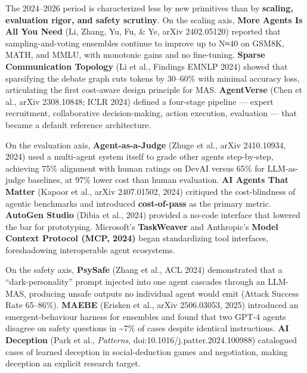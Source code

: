 The 2024--2026 period is characterized less by new primitives than by \textbf{scaling, evaluation rigor, and safety scrutiny}. On the scaling axis, \textbf{More Agents Is All You Need} (Li, Zhang, Yu, Fu, \& Ye, arXiv 2402.05120) reported that sampling-and-voting ensembles continue to improve up to N≈40 on GSM8K, MATH, and MMLU, with monotonic gains and no fine-tuning. \textbf{Sparse Communication Topology} (Li et al., Findings EMNLP 2024) showed that sparsifying the debate graph cuts tokens by 30--60\% with minimal accuracy loss, articulating the first cost-aware design principle for MAS. \textbf{AgentVerse} (Chen et al., arXiv 2308.10848; ICLR 2024) defined a four-stage pipeline --- expert recruitment, collaborative decision-making, action execution, evaluation --- that became a default reference architecture.

On the evaluation axis, \textbf{Agent-as-a-Judge} (Zhuge et al., arXiv 2410.10934, 2024) used a multi-agent system itself to grade other agents step-by-step, achieving 75\% alignment with human ratings on DevAI versus 65\% for LLM-as-judge baselines, at 97\% lower cost than human evaluation. \textbf{AI Agents That Matter} (Kapoor et al., arXiv 2407.01502, 2024) critiqued the cost-blindness of agentic benchmarks and introduced \textbf{cost-of-pass} as the primary metric. \textbf{AutoGen Studio} (Dibia et al., 2024) provided a no-code interface that lowered the bar for prototyping. Microsoft's \textbf{TaskWeaver} and Anthropic's \textbf{Model Context Protocol (MCP, 2024)} began standardizing tool interfaces, foreshadowing interoperable agent ecosystems.

On the safety axis, \textbf{PsySafe} (Zhang et al., ACL 2024) demonstrated that a ``dark-personality'' prompt injected into one agent cascades through an LLM-MAS, producing unsafe outputs no individual agent would emit (Attack Success Rate 65--86\%). \textbf{MAEBE} (Erisken et al., arXiv 2506.03053, 2025) introduced an emergent-behaviour harness for ensembles and found that two GPT-4 agents disagree on safety questions in \textasciitilde7\% of cases despite identical instructions. \textbf{AI Deception} (Park et al., \emph{Patterns}, doi:10.1016/j.patter.2024.100988) catalogued cases of learned deception in social-deduction games and negotiation, making deception an explicit research target.

